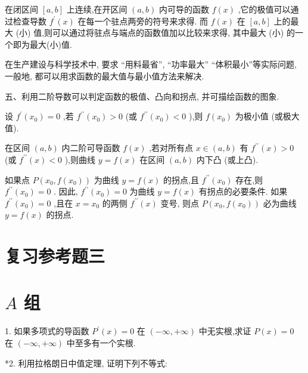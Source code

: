\documentclass[10pt]{article}
\begin{document}
在闭区间 \(\left\lbrack {a,b}\right\rbrack\) 上连续,在开区间 \(\left( {a,b}\right)\) 内可导的函数 \(f\left( x\right)\) ,它的极值可以通过检查导数 \({f}^{\prime }\left( x\right)\) 在每一个驻点两旁的符号来求得. 而 \(f\left( x\right)\) 在 \(\left\lbrack {a,b}\right\rbrack\) 上的最大 (小) 值,则可以通过将驻点与端点的函数值加以比较来求得, 其中最大 (小) 的一个即为最大(小)值.

在生产建设与科学技术中, 要求 “用料最省”, “功率最大” “体积最小”等实际问题, 一般地, 都可以用求函数的最大值与最小值方法来解决.

五、利用二阶导数可以判定函数的极值、凸向和拐点, 并可描绘函数的图象.

设 \({f}^{\prime }\left( {x}_{0}\right) = 0\) ,若 \({f}^{\prime \prime }\left( {x}_{0}\right) > 0\) (或 \({f}^{\prime \prime }\left( {x}_{0}\right) < 0\) ),则 \(f\left( {x}_{0}\right)\) 为极小值 (或极大值).

在区间 \(\left( {a,b}\right)\) 内二阶可导函数 \(f\left( x\right)\) ,若对所有点 \(x \in \left( {a,b}\right)\) 有 \({f}^{\prime \prime }\left( x\right) > 0\) (或 \({f}^{\prime \prime }\left( x\right) < 0\) ),则曲线 \(y = f\left( x\right)\) 在区间 \(\left( {a,b}\right)\) 内下凸 (或上凸).

如果点 \(P\left( {{x}_{0},f\left( {x}_{0}\right) }\right)\) 为曲线 \(y = f\left( x\right)\) 的拐点,且 \({f}^{\prime \prime }\left( {x}_{0}\right)\) 存在,则 \({f}^{\prime \prime }\left( {x}_{0}\right) = 0\) . 因此, \({f}^{\prime \prime }\left( {x}_{0}\right) = 0\) 为曲线 \(y = f\left( x\right)\) 有拐点的必要条件. 如果 \({f}^{\prime \prime }\left( {x}_{0}\right) = 0\) ,且在 \(x = {x}_{0}\) 的两侧 \({f}^{\prime \prime }\left( x\right)\) 变号, 则点 \(P\left( {{x}_{0},f\left( {x}_{0}\right) }\right)\) 必为曲线 \(y = f\left( x\right)\) 的拐点.

\section*{复习参考题三}

\section*{\(A\) 组}

1. 如果多项式的导函数 \({P}^{\prime }\left( x\right) = 0\) 在 \(\left( {-\infty , + \infty }\right)\) 中无实根,求证 \(P\left( x\right) = 0\) 在 \(\left( {-\infty , + \infty }\right)\) 中至多有一个实根.

*2. 利用拉格朗日中值定理, 证明下列不等式:
\end{document}
